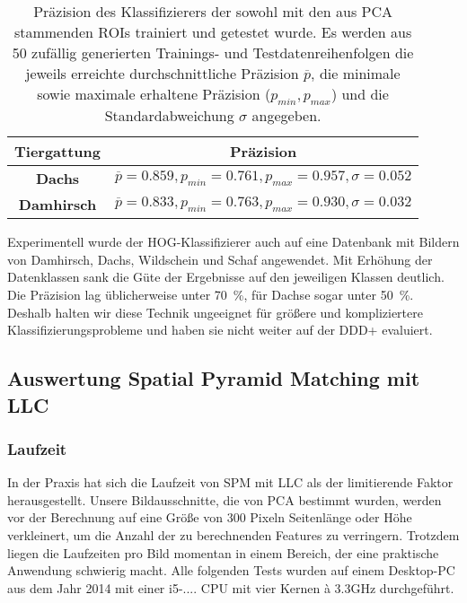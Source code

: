 \begin{table}[]
	\centering
	\caption{Präzision des Klassifizierers der sowohl mit den aus PCA stammenden ROIs trainiert und getestet wurde. Es werden aus 50 zufällig generierten Trainings- und Testdatenreihenfolgen die jeweils erreichte durchschnittliche Präzision $\overline{p}$, die minimale sowie maximale erhaltene Präzision ($p_{min}, p_{max}$) und die Standardabweichung $\sigma$ angegeben. }
	\label{tab:HOG:ResultsAuto}
	\begin{tabular}{cl}
		\hline
		\textbf{Tiergattung} 	       & \multicolumn{1}{c}{\textbf{Präzision}}                                                                                                                                                  \\ \hline
		\textbf{Dachs}                         &$\overline{p}= 0.859, p_{min}=0.761, p_{max}=0.957, \sigma=0.052$ \\
		\textbf{Damhirsch}                &$\overline{p}=0.833, p_{min}=0.763, p_{max}=0.930, \sigma=0.032$ \\
		\hline
	\end{tabular}
\end{table}

Experimentell wurde der HOG-Klassifizierer auch auf eine Datenbank mit Bildern von Damhirsch, Dachs, Wildschein und Schaf angewendet. Mit Erhöhung der Datenklassen sank die Güte der Ergebnisse auf den jeweiligen Klassen deutlich. Die Präzision lag üblicherweise unter 70~\%, für Dachse sogar unter 50~\%. Deshalb halten wir diese Technik ungeeignet für größere und kompliziertere Klassifizierungsprobleme und haben sie nicht weiter auf der DDD+ evaluiert.

\subsection{Auswertung Spatial Pyramid Matching mit LLC}

\subsubsection{Laufzeit}

In der Praxis hat sich die Laufzeit von SPM mit LLC als der limitierende Faktor herausgestellt. Unsere Bildausschnitte, die von PCA bestimmt wurden, werden vor der Berechnung auf eine Größe von 300 Pixeln Seitenlänge oder Höhe verkleinert, um die Anzahl der zu berechnenden Features zu verringern. Trotzdem liegen die Laufzeiten pro Bild momentan in einem Bereich, der eine praktische Anwendung schwierig macht. Alle folgenden Tests wurden auf einem Desktop-PC aus dem Jahr 2014 mit einer i5-.... CPU mit vier Kernen à 3.3GHz durchgeführt.

